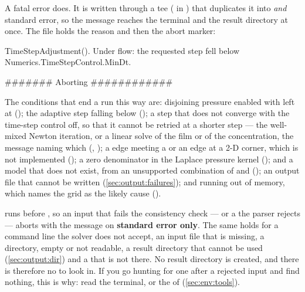 A fatal error does. It is written through a tee ( in
) that duplicates it into
 \emph{and} standard error, so the message reaches the
terminal and the result directory at once. The file holds the reason and then
the abort marker:

\begin{plain}
TimeStepAdjustment(). Under flow: the requested step fell below Numerics.TimeStepControl.MinDt.

####### Aborting ############
\end{plain}

The conditions that end a run this way are: disjoining pressure enabled with
 left at 
(); the adaptive step falling below
(); a step that does not converge
with the time-step control off, so that it cannot be retried at a shorter
step --- the well-mixed Newton iteration, or a linear solve of the film or
of the concentration, the message naming which
(,
); a
 edge meeting a  or an  edge
at a 2-D corner, which is not implemented
(); a zero denominator in the Laplace
pressure kernel (); and
a model that does not exist, from an unsupported combination of
 and 
(); an output file that cannot be written
(\cref{sec:output:failures}); and running out of memory, which names the
grid as the likely cause ().

\begin{warn}
   runs before , so an input
  that fails the consistency check --- or a  the parser
  rejects --- aborts with the message on \textbf{standard error only}. The
  same holds for a command line the solver does not accept, an input file
  that is missing, a directory, empty or not readable, a result directory
  that cannot be used (\cref{sec:output:dir}) and a 
  that is not there. No result directory is created, and there is therefore
  no  to look in. If you go hunting for one after a
  rejected input and find nothing, this is why: read the terminal, or the
   of  (\cref{sec:env:tools}).
\end{warn}

